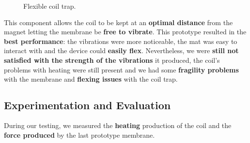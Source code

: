 \newsavebox{\bigimage}
\begin{figure}[H]
    \centering
    \begin{subcaptiongroup}
        \centering
        \parbox[b]{0.2\textwidth}{
            \centering
        }
        \parbox[b]{0.2\textwidth}{
            \centering
            \usebox{
                \bigimage
            }
        }
        
    \end{subcaptiongroup}
    \caption{Flexible coil trap.}
\end{figure}

This component allows the coil to be kept at an \textbf{optimal distance} from the magnet letting the membrane be \textbf{free to vibrate}.
This prototype resulted in the \textbf{best performance}: the vibrations were more noticeable, the mat was easy to interact with and the device could \textbf{easily flex}.
Nevertheless, we were \textbf{still not satisfied with the strength of the vibrations} it produced, the coil's problems with heating were still present and we had some \textbf{fragility problems} with the membrane and \textbf{flexing issues} with the coil trap. 

\subsection{Experimentation and Evaluation}
During our testing, we measured the \textbf{heating} production of the coil and the \textbf{force produced} by the last prototype membrane.

